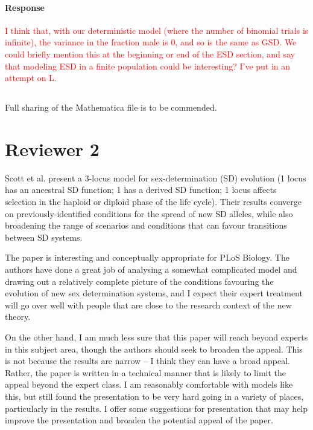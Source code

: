\documentclass[10pt,letterpaper]{article}
\begin{document}
\noindent\paragraph{Response}
\textcolor{red}{I think that, with our deterministic model (where the number of binomial trials is infinite), the variance in the fraction male is 0, and so is the same as GSD. We could briefly mention this at the beginning or end of the ESD section, and say that modeling ESD in a finite population could be interesting? I've put in an attempt on L.}

\noindent\subsection{}
Full sharing of the Mathematica file is to be commended.

\section{Reviewer 2}

Scott et al. present a 3-locus model for sex-determination (SD) evolution (1 locus has an ancestral SD function; 1 has a derived SD function; 1 locus affects selection in the haploid or diploid phase of the life cycle). Their results converge on previously-identified conditions for the spread of new SD alleles, while also broadening the range of scenarios and conditions that can favour transitions between SD systems.

The paper is interesting and conceptually appropriate for PLoS Biology. The authors have done a great job of analysing a somewhat complicated model and drawing out a relatively complete picture of the conditions favouring the evolution of new sex determination systems, and I expect their expert treatment will go over well with people that are close to the research context of the new theory.

On the other hand, I am much less sure that this paper will reach beyond experts in this subject area, though the authors should seek to broaden the appeal. This is not because the results are narrow -- I think they can have a broad appeal. Rather, the paper is written in a technical manner that is likely to limit the appeal beyond the expert class. I am reasonably comfortable with models like this, but still found the presentation to be very hard going in a variety of places, particularly in the results. I offer some suggestions for presentation that may help improve the presentation and broaden the potential appeal of the paper.
\end{document}
